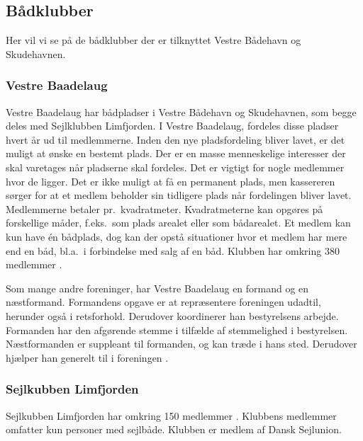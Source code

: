 \subsection{Bådklubber}
Her vil vi se på de bådklubber der er tilknyttet Vestre Bådehavn og Skudehavnen.

\subsubsection{Vestre Baadelaug}
Vestre Baadelaug har bådpladser i Vestre Bådehavn og Skudehavnen, som begge deles med Sejlklubben Limfjorden. I Vestre Baadelaug, fordeles disse pladser hvert år ud til medlemmerne. Inden den nye pladsfordeling bliver lavet, er det muligt at ønske en bestemt plads. Der er en masse menneskelige interesser der skal varetages når pladserne skal fordeles. Det er vigtigt for nogle medlemmer hvor de ligger. Det er ikke muligt at få en permanent plads, men kassereren sørger for at et medlem beholder sin tidligere plads når fordelingen bliver lavet. Medlemmerne betaler pr.\ kvadratmeter. Kvadratmeterne kan opgøres på forskellige måder, f.eks.\ som plads arealet eller som bådarealet. Et medlem kan kun have én bådplads, dog kan der opstå situationer hvor et medlem har mere end en båd, bl.a.\ i forbindelse med salg af en båd. Klubben har omkring 380 medlemmer \cite{int_vb_sl}.

Som mange andre foreninger, har Vestre Baadelaug en formand og en næstformand. Formandens opgave er at repræsentere foreningen udadtil, herunder også i retsforhold. Derudover koordinerer han bestyrelsens arbejde. Formanden har den afgørende stemme i tilfælde af stemmelighed i bestyrelsen. Næstformanden er suppleant til formanden, og kan træde i hans sted. Derudover hjælper han generelt til i foreningen \cite{vestre_vedtagter}.

\subsubsection{Sejlkubben Limfjorden}
Sejlkubben Limfjorden har omkring 150 medlemmer \cite{int_vb_sl}. Klubbens medlemmer omfatter kun personer med sejlbåde. Klubben er medlem af Dansk Sejlunion.


